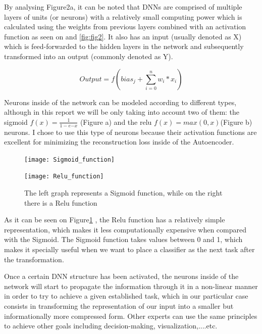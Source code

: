 By analysing Figure2a, it can be noted that DNNs are comprised of multiple layers of units (or neurons) with a relatively small computing power which is calculated using the weights from previous layers combined with an activation function as seen on and \ref{fig:fig2}. It also has an input (usually denoted as X) which is feed-forwarded to the hidden layers in the network and subsequently transformed into an output (commonly denoted as Y). 

\begin{equation}\label{eq:artificial neuron}
Output = f( bias_j + \sum_{i = 0}^{n} w_{i}*x_i ) 
\end{equation}


Neurons inside of the network can be modeled according to different types, although in this report we will be only taking into account two of them: the sigmoid $f(x) = \frac{1}{1 - e{-x}}$ (Figure a) and the relu $f(x) = max(0,x)$(Figure b) neurons. I chose to use this type of neurons because their activation functions are excellent for minimizing the reconstruction loss inside of the Autoencoder. \newline

\begin{figure}[H]
	\begin{minipage}{.5\textwidth}
		\texttt{[image: Sigmoid\_function]}
	\end{minipage}%
	\begin{minipage}{.5\textwidth}
		\begin{flushright}
			\texttt{[image: Relu\_function]}  
		\end{flushright} 
	\end{minipage}  
	\caption{The left graph represents a Sigmoid function, while on the right there is a Relu function}
	\label{fig:fig3}
\end{figure}

As it can be seen on Figure\ref{fig:fig3} , the Relu function has a relatively simple representation, which makes it less computationally expensive when compared with the Sigmoid. The Sigmoid function takes values between 0 and 1, which makes it specially useful when we want to place a classifier as the next task after the transformation.\par 

Once a certain DNN structure has been activated, the neurons inside of the network will start to propagate the information through it in a non-linear manner in order to try to achieve a given established task, which in our particular case consists in transforming the representation of our input into a smaller but informationally more compressed form. Other experts can use the same principles to achieve other goals including decision-making, visualization,....etc.\par

